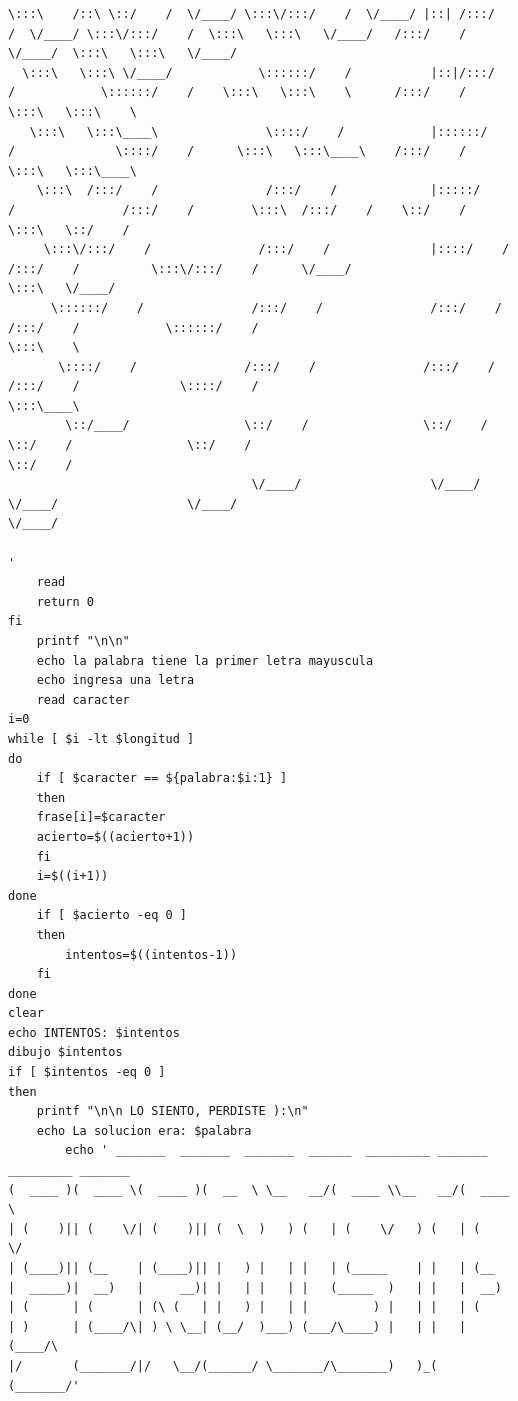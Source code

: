 \documentclass[12pt,a4paper]{article}
\begin{document}
\begin{lstlisting}[style=BashInputStyle]
 \:::\    /::\ \::/    /  \/____/ \:::\/:::/    /  \/____/ |::| /:::/    /  \/____/ \:::\/:::/    /  \:::\   \:::\   \/____/   /:::/    / \/____/  \:::\   \:::\   \/____/ 
  \:::\   \:::\ \/____/            \::::::/    /           |::|/:::/    /            \::::::/    /    \:::\   \:::\    \      /:::/    /            \:::\   \:::\    \     
   \:::\   \:::\____\               \::::/    /            |::::::/    /              \::::/    /      \:::\   \:::\____\    /:::/    /              \:::\   \:::\____\    
    \:::\  /:::/    /               /:::/    /             |:::::/    /               /:::/    /        \:::\  /:::/    /    \::/    /                \:::\   \::/    /    
     \:::\/:::/    /               /:::/    /              |::::/    /               /:::/    /          \:::\/:::/    /      \/____/                  \:::\   \/____/     
      \::::::/    /               /:::/    /               /:::/    /               /:::/    /            \::::::/    /                                 \:::\    \         
       \::::/    /               /:::/    /               /:::/    /               /:::/    /              \::::/    /                                   \:::\____\        
        \::/____/                \::/    /                \::/    /                \::/    /                \::/    /                                     \::/    /        
                                  \/____/                  \/____/                  \/____/                  \/____/                                       \/____/         
                                                                                                                                                                           '
    read
    return 0
fi
    printf "\n\n"
    echo la palabra tiene la primer letra mayuscula
    echo ingresa una letra
    read caracter
i=0
while [ $i -lt $longitud ]
do
    if [ $caracter == ${palabra:$i:1} ]
    then
    frase[i]=$caracter
    acierto=$((acierto+1))
    fi
    i=$((i+1))
done
    if [ $acierto -eq 0 ]
    then
        intentos=$((intentos-1))
    fi
done
clear
echo INTENTOS: $intentos
dibujo $intentos
if [ $intentos -eq 0 ]
then
    printf "\n\n LO SIENTO, PERDISTE ):\n"
    echo La solucion era: $palabra
        echo ' _______  _______  _______  ______  _________ _______ _________ _______ 
(  ____ )(  ____ \(  ____ )(  __  \ \__   __/(  ____ \\__   __/(  ____ \
| (    )|| (    \/| (    )|| (  \  )   ) (   | (    \/   ) (   | (    \/
| (____)|| (__    | (____)|| |   ) |   | |   | (_____    | |   | (__    
|  _____)|  __)   |     __)| |   | |   | |   (_____  )   | |   |  __)   
| (      | (      | (\ (   | |   ) |   | |         ) |   | |   | (      
| )      | (____/\| ) \ \__| (__/  )___) (___/\____) |   | |   | (____/\
|/       (_______/|/   \__/(______/ \_______/\_______)   )_(   (_______/'


\end{lstlisting}
\end{document}
